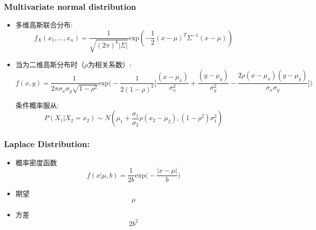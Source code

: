 \documentclass{article} 	%
\begin{document}
                \subsubsection{Multivariate normal distribution}
                        \begin{itemize}
                                \item
                                多维高斯联合分布:
                                $$f_X(x_1,\ldots,x_n) = \frac{1}{\sqrt{(2\pi)^k|\Sigma|}}\mathrm{exp}(-\frac{1}{2}(x-\mu)^T\Sigma^{-1}(x-\mu))$$
                                
                                \item
                                当为二维高斯分布时（$\rho$为相关系数）:\\
                                $$f(x,y) = \frac{1}{2\pi\sigma_x\sigma_y\sqrt{1-\rho^2}}\mathrm{exp}\Big( -\frac{1}{2(1-\rho)^2} 
                                \Big[\frac{(x-\mu_x)}{\sigma_x^2}+\frac{(y-\mu_y)}{\sigma_y^2} - \frac{2\rho(x-\mu_x)(y-\mu_y)}{\sigma_x\sigma_y}\Big]\Big)$$
                                
                                条件概率服从:
                                $$P(X_1\big|X_2 =x_2)\sim N(\mu_1 +\frac{\sigma_1}{\sigma_2}\rho(x_2-\mu_2),(1-\rho^2)\sigma_1^2)$$
                        \end{itemize}
	        
	        \subsubsection{Laplace Distribution:}
	        		\begin{itemize}
			\item
			概率密度函数\\
			$$f(x|\mu,b)= \displaystyle\frac{1}{2b} \mathrm{exp}\big(-\frac{|x-\mu|}{b}\big)$$
			\item
			期望\\
			$$\mu$$
			\item
			方差\\
			$$2b^2$$
			\end{itemize}
	
\end{document}
